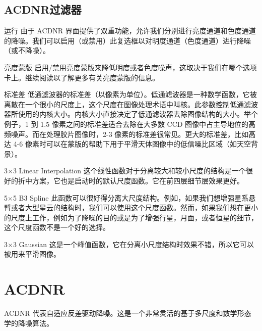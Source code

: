 \subsection{ACDNR过滤器}

\begin{nounexplanation}
  \item[运行\translate{Apply}] 由于 ACDNR 界面提供了双重功能，允许我们分别进行亮度通道和色度通道的降噪。我们可以启用（或禁用）此复选框以对明度通道（色度通道）进行降噪（或不降噪）。

  \item[亮度蒙版\translate{Lightness mask}] 启用/禁用亮度蒙版来降低明度或者色度噪声，这取决于我们在哪个选项卡上。继续阅读以了解更多有关亮度蒙版的信息。
  
  \item[标准差\translate{Std.Dev.}] 低通滤波器的标准差（以像素为单位）。低通滤波器是一种数学函数，它被离散在一个很小的尺度上，这个尺度在图像处理术语中叫核。此参数控制低通滤波器所使用的内核大小。内核大小直接决定了低通滤波器去除图像结构的大小。举个例子，1 到 1.5 像素之间的标准差适合去除在大多数 CCD 图像中占主导地位的高频噪声。而在处理胶片图像时，2-3 像素的标准差很常见。更大的标准差，比如高达 4-6 像素时可以在蒙版的帮助下用于平滑天体图像中的低信噪比区域（如天空背景）。
    \begin{nounexplanation}
      \item[3$\times$3 Linear Interpolation] 这个线性函数对于分离较大和较小尺度的结构是一个很好的折中方案，它也是启动时的默认尺度函数。它在前四层细节层效果更好。
      \item[5$\times$5 B3 Spline] 此函数可以很好得分离大尺度结构。例如，如果我们想增强星系悬臂或者大型星云的结构时，我们可以使用这个尺度函数。然而，如果我们想在更小的尺度上工作，例如为了降噪的目的或是为了增强行星，月面，或者恒星的细节，这个尺度函数不是一个好的选择。
      \item[3$\times$3 Gaussian] 这是一个峰值函数，它在分离小尺度结构时效果不错，所以它可以被用来平滑图像。
    \end{nounexplanation}
\end{nounexplanation}


\section{ACDNR}

ACDNR 代表自适应反差驱动降噪。这是一个非常灵活的基于多尺度和数学形态学的降噪算法。

